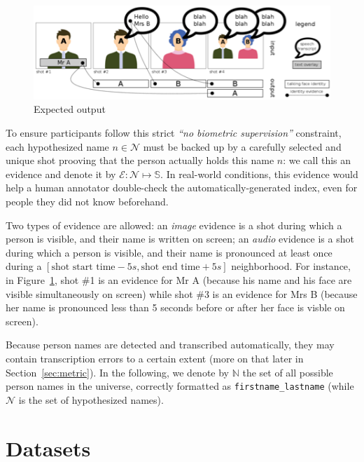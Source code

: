 \documentclass{acm_proc_article-me}
\newcommand\refNames{\mathbb{N}}
\newcommand\shots{\mathbb{S}}
\newcommand\hypEvidences{\mathcal{E}}
\newcommand\hypNames{\mathcal{N}}
\begin{document}
\begin{figure}[!htb]
 \center
 \includegraphics[width=1\linewidth]{figs/evidence.png}
 \centering
 \caption {Expected output}
 \label{fig:evidence}
\end{figure}

To ensure participants follow this strict \emph{``no biometric supervision''} constraint, each hypothesized name $n \in \hypNames$ must be backed up by a carefully selected and unique shot prooving that the person actually holds this name $n$: we call this an evidence and denote it by $\hypEvidences : \hypNames \mapsto \shots$. In real-world conditions, this evidence would help a human annotator double-check the automatically-generated index, even for people they did not know beforehand.

Two types of evidence are allowed: an \emph{image} evidence is a shot during which a person is visible, and their name is written on screen; an \emph{audio} evidence is a shot during which a person is visible, and their name is pronounced at least once during a $[\text{shot start time} - 5s, \text{shot end time} + 5s ]$ neighborhood.
For instance, in Figure~\ref{fig:evidence}, shot \#1 is an evidence for Mr A (because his name and his face are visible simultaneously on screen) while shot \#3 is an evidence for Mrs B (because her name is pronounced less than 5 seconds before or after her face is visble on screen).

Because person names are detected and transcribed automatically, they may contain transcription errors to a certain extent (more on that later in Section~\ref{sec:metric}). In the following, we denote by $\refNames$ the set of all possible person names in the universe, correctly formatted as \texttt{firstname\_lastname} (while $\hypNames$ is the set of hypothesized names).

\section{Datasets}
\end{document}
